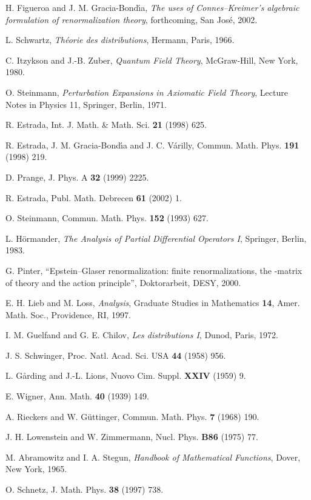\documentclass[a4paper,12pt]{article}
\providecommand{\Sf}{\mathbb{S}}       %
\providecommand{\7}{\dagger}           %
\theoremstyle{plain}
\theoremstyle{definition}
\begin{document}
\begin{thebibliography}{34}
H. Figueroa and J. M. Gracia-Bond\'{\i}a,
{\sl The uses of Connes--Kreimer's algebraic formulation of
renormalization theory}, forthcoming, San Jos\'e, 2002.

L. Schwartz,
\textit{Th\'eorie des distributions},
Hermann, Paris, 1966.

C. Itzykson and J.-B. Zuber,
\textit{Quantum Field Theory},
McGraw-Hill, New York, 1980.

O. Steinmann,
\textit{Perturbation Expansions in Axiomatic Field Theory},
Lecture Notes in Physics 11, Springer, Berlin, 1971.

R. Estrada,
Int. J. Math. \& Math. Sci. {\bf 21} (1998) 625.

R. Estrada, J. M.
Gracia-Bond\'{\i}a and J. C. V\'arilly,
Commun. Math. Phys. {\bf 191} (1998) 219.

D. Prange,
J. Phys. A {\bf 32} (1999) 2225.

R. Estrada,
Publ. Math. Debrecen {\bf 61} (2002) 1.

O. Steinmann,
Commun. Math. Phys. {\bf 152} (1993) 627.

L. H\"ormander,
\textit{The Analysis of Partial Differential Operators I},
Springer, Berlin, 1983.

G. Pinter, ``Epstein--Glaser renormalization: finite renormalizations,
the \myHighlight{$\Sf$}\coordHE{}-matrix of \coordHE{} theory and the action principle'',
Doktorarbeit, DESY, 2000.

E. H. Lieb and M. Loss,
\textit{Analysis},
Graduate Studies in Mathematics {\bf 14},
Amer. Math. Soc., Providence, RI, 1997.

I. M. Guelfand and G. E. Chilov,
\textit{Les distributions I},
Dunod, Paris, 1972.

J. S. Schwinger,
Proc. Natl. Acad. Sci. USA {\bf 44} (1958) 956.

L. G{\aa}rding and J.-L. Lions,
Nuovo Cim. Suppl. {\bf XXIV} (1959) 9.

E. Wigner,
Ann. Math. {\bf 40} (1939) 149.

A. Rieckers and W. G\"uttinger,
Commun. Math. Phys. {\bf 7} (1968) 190.

J. H. Lowenstein and W. Zimmermann,
Nucl. Phys. {\bf B86} (1975) 77.

M. Abramowitz and I. A. Stegun,
\textit{Handbook of Mathematical Functions},
Dover, New York, 1965.

O. Schnetz,
J. Math. Phys. {\bf 38} (1997) 738.

\end{thebibliography}
\end{document}
